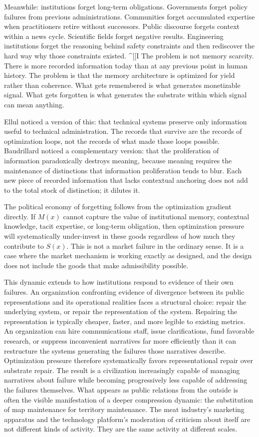 \documentclass[11pt, letterpaper]{article}
\begin{document}
Meanwhile: institutions forget long-term obligations. Governments forget policy failures from previous administrations. Communities forget accumulated expertise when practitioners retire without successors. Public discourse forgets context within a news cycle. Scientific fields forget negative results. Engineering institutions forget the reasoning behind safety constraints and then rediscover the hard way why those constraints existed.
^[[I
The problem is not memory scarcity. There is more recorded information today than at any previous point in human history. The problem is that the memory architecture is optimized for yield rather than coherence. What gets remembered is what generates monetizable signal. What gets forgotten is what generates the substrate within which signal can mean anything.

Ellul noticed a version of this: that technical systems preserve only information useful to technical administration. The records that survive are the records of optimization loops, not the records of what made those loops possible. Baudrillard noticed a complementary version: that the proliferation of information paradoxically destroys meaning, because meaning requires the maintenance of distinctions that information proliferation tends to blur. Each new piece of recorded information that lacks contextual anchoring does not add to the total stock of distinction; it dilutes it.

The political economy of forgetting follows from the optimization gradient directly. If $M(x)$ cannot capture the value of institutional memory, contextual knowledge, tacit expertise, or long-term obligation, then optimization pressure will systematically under-invest in these goods regardless of how much they contribute to $S(x)$. This is not a market failure in the ordinary sense. It is a case where the market mechanism is working exactly as designed, and the design does not include the goods that make admissibility possible.

This dynamic extends to how institutions respond to evidence of their own failures. An organization confronting evidence of divergence between its public representations and its operational realities faces a structural choice: repair the underlying system, or repair the representation of the system. Repairing the representation is typically cheaper, faster, and more legible to existing metrics. An organization can hire communications staff, issue clarifications, fund favorable research, or suppress inconvenient narratives far more efficiently than it can restructure the systems generating the failures those narratives describe. Optimization pressure therefore systematically favors representational repair over substrate repair. The result is a civilization increasingly capable of managing narratives about failure while becoming progressively less capable of addressing the failures themselves. What appears as public relations from the outside is often the visible manifestation of a deeper compression dynamic: the substitution of map maintenance for territory maintenance. The meat industry's marketing apparatus and the technology platform's moderation of criticism about itself are not different kinds of activity. They are the same activity at different scales.
\end{document}
